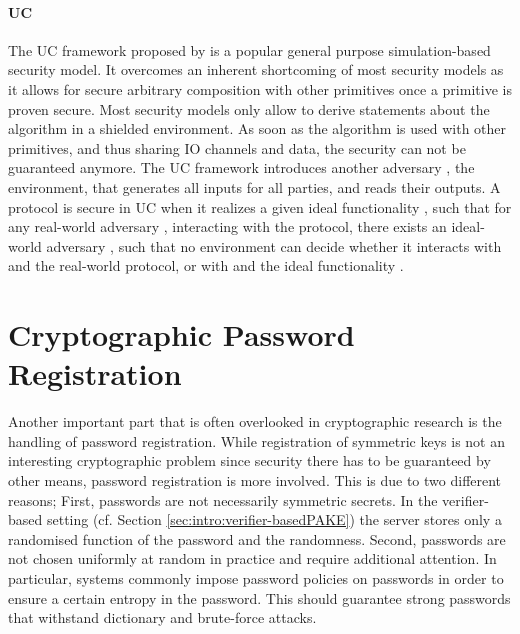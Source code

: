 \paragraph{\acl{UC}}
The \ac{UC} framework proposed by \citet{Canetti2001a} is a popular general purpose simulation-based security model.
It overcomes an inherent shortcoming of most security models as it allows for secure arbitrary composition with other primitives once a primitive is proven secure.
Most security models only allow to derive statements about the algorithm in a shielded environment.
As soon as the algorithm is used with other primitives, and thus sharing \ac{IO} channels and data, the security can not be guaranteed anymore.
The \ac{UC} framework introduces another adversary \UCZ, the environment, that generates all inputs for all parties, and reads their outputs.
A protocol is secure in \ac{UC} when it realizes a given ideal functionality \UCF, such that for any real-world adversary \A, interacting with the protocol, there exists an ideal-world adversary \UCS, such that no environment \UCZ can decide whether it interacts with \A and the real-world protocol, or with \UCS and the ideal functionality \UCF.


\section{Cryptographic Password Registration}
Another important part that is often overlooked in cryptographic research is the handling of password registration.
While registration of symmetric keys is not an interesting cryptographic problem since security there has to be guaranteed by other means, password registration is more involved.
This is due to two different reasons;
First, passwords are not necessarily symmetric secrets.
In the verifier-based setting (cf. Section \ref{sec:intro:verifier-basedPAKE}) the server stores only a randomised function of the password and the randomness.
Second, passwords are not chosen uniformly at random in practice and require additional attention.
In particular, systems commonly impose password policies on passwords in order to ensure a certain entropy in the password.
This should guarantee strong passwords that withstand dictionary and brute-force attacks.

